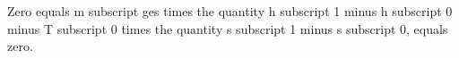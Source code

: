 Zero equals m subscript ges times the quantity h subscript 1 minus h subscript 0 minus T subscript 0 times the quantity s subscript 1 minus s subscript 0, equals zero.